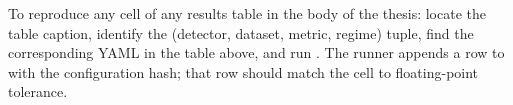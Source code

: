 To reproduce any cell of any results table in the body of the thesis: locate the table caption, identify the (detector, dataset, metric, regime) tuple, find the corresponding YAML in the table above, and run .  The runner appends a row to  with the configuration hash; that row should match the cell to floating-point tolerance.
